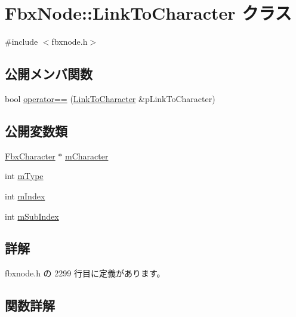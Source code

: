 \hypertarget{class_fbx_node_1_1_link_to_character}{}\section{Fbx\+Node\+:\+:Link\+To\+Character クラス}
\label{class_fbx_node_1_1_link_to_character}


{\ttfamily \#include $<$fbxnode.\+h$>$}

\subsection*{公開メンバ関数}
\begin{DoxyCompactItemize}
\item 
bool \hyperlink{class_fbx_node_1_1_link_to_character_a7a05beb9afe0aa5367743a011a3e1182}{operator==} (\hyperlink{class_fbx_node_1_1_link_to_character}{Link\+To\+Character} \&p\+Link\+To\+Character)
\end{DoxyCompactItemize}
\subsection*{公開変数類}
\begin{DoxyCompactItemize}
\item 
\hyperlink{class_fbx_character}{Fbx\+Character} $\ast$ \hyperlink{class_fbx_node_1_1_link_to_character_adc1f08186e1643f6257a39487c7fff1a}{m\+Character}
\item 
int \hyperlink{class_fbx_node_1_1_link_to_character_a2f4f7682807d446a976ec780312043ef}{m\+Type}
\item 
int \hyperlink{class_fbx_node_1_1_link_to_character_a67864508b5c8a7ee952d5d28d46e3853}{m\+Index}
\item 
int \hyperlink{class_fbx_node_1_1_link_to_character_a04cbe50393b9a5822efabf140fe79876}{m\+Sub\+Index}
\end{DoxyCompactItemize}


\subsection{詳解}


 fbxnode.\+h の 2299 行目に定義があります。



\subsection{関数詳解}
\mbox{\label{class_fbx_node_1_1_link_to_character_a7a05beb9afe0aa5367743a011a3e1182}} 
